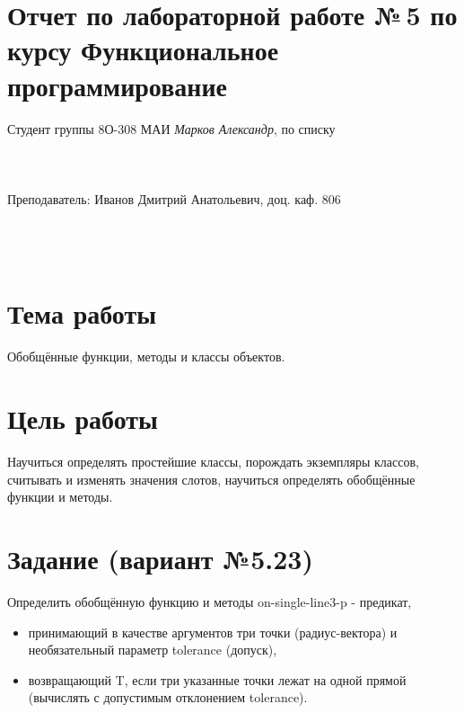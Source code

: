 \documentclass[12pt]{article}
\begin{document}
\section*{Отчет по лабораторной работе №\,5
по курсу \guillemotleft  Функциональное программирование\guillemotright}
\begin{flushright}
Студент группы 8О-308 МАИ \textit{Марков Александр},  по списку \\
 \\
 \\
\ \\
Преподаватель: Иванов Дмитрий Анатольевич, доц. каф. 806 \\
 \\
 \\
 \\

\end{flushright}

\section{Тема работы}
Обобщённые функции, методы и классы объектов.

\section{Цель работы}
Научиться определять простейшие классы, порождать экземпляры классов, считывать и изменять значения слотов, научиться определять обобщённые функции и методы.

\section{Задание (вариант №5.23)}

Определить обобщённую функцию и методы on-single-line3-p - предикат,

\begin{itemize}
    \item принимающий в качестве аргументов три точки (радиус-вектора) и необязательный параметр tolerance (допуск),
    \item возвращающий T, если три указанные точки лежат на одной прямой (вычислять с допустимым отклонением tolerance).
\end{itemize}
\end{document}
